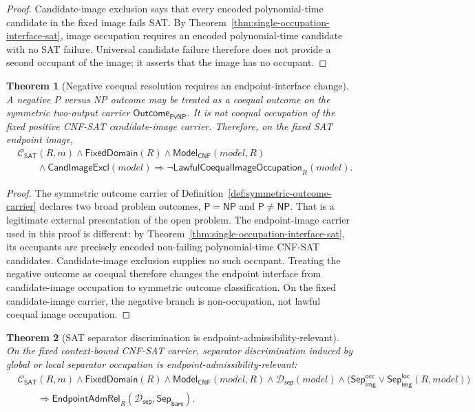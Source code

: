\documentclass[11pt]{article}
\newtheorem{theorem}{Theorem}[section]
\theoremstyle{definition}
\theoremstyle{remark}
\newcommand{\SepBare}{\mathsf{Sep}_{\mathsf{bare}}}
\newcommand{\SepImgOcc}{\mathsf{Sep}_{\mathsf{img}}^{\mathsf{occ}}}
\newcommand{\LocalSepImgOcc}{\mathsf{Sep}_{\mathsf{img}}^{\mathsf{loc}}}
\newcommand{\Pclass}{\mathsf{P}}
\newcommand{\NPclass}{\mathsf{NP}}
\newcommand{\ClayCtx}{\mathcal{C}_{\mathsf{SAT}}(R,m)}
\newcommand{\FixedDom}{\mathsf{FixedDomain}}
\newcommand{\SepDisc}{\mathcal{D}_{\mathsf{sep}}}
\newcommand{\ModelOfCnf}{\mathsf{Model}_{\mathsf{CNF}}}
\newcommand{\CandImageExcl}{\mathsf{CandImageExcl}}
\newcommand{\OutcomePvNP}{\mathsf{Outcome}_{\mathsf{PvNP}}}
\newcommand{\LawfulCoequalImageOcc}{\mathsf{LawfulCoequalImageOccupation}}
\newcommand{\EndpointAdmRel}{\mathsf{EndpointAdmRel}}
\begin{document}
\begin{proof}
Candidate-image exclusion says that every encoded polynomial-time candidate in the fixed image fails SAT. By Theorem~\ref{thm:single-occupation-interface-sat}, image occupation requires an encoded polynomial-time candidate with no SAT failure. Universal candidate failure therefore does not provide a second occupant of the image; it asserts that the image has no occupant.
\end{proof}

\begin{theorem}[Negative coequal resolution requires an endpoint-interface change]\label{thm:negative-coequal-requires-interface-change}
A negative P versus NP outcome may be treated as a coequal outcome on the symmetric two-output carrier \(\OutcomePvNP\). It is not coequal occupation of the fixed positive CNF-SAT candidate-image carrier. Therefore, on the fixed SAT endpoint image,
\[
\begin{aligned}
  &\ClayCtx\wedge\FixedDom(R)\wedge\ModelOfCnf(model,R)\\
  &\qquad\wedge\CandImageExcl(model)
  \Rightarrow \neg\LawfulCoequalImageOcc_R(model).
\end{aligned}
\]
\end{theorem}

\begin{proof}
The symmetric outcome carrier of Definition~\ref{def:symmetric-outcome-carrier} declares two broad problem outcomes, \(\Pclass=\NPclass\) and \(\Pclass\neq\NPclass\). That is a legitimate external presentation of the open problem. The endpoint-image carrier used in this proof is different: by Theorem~\ref{thm:single-occupation-interface-sat}, its occupants are precisely encoded non-failing polynomial-time CNF-SAT candidates. Candidate-image exclusion supplies no such occupant. Treating the negative outcome as coequal therefore changes the endpoint interface from candidate-image occupation to symmetric outcome classification. On the fixed candidate-image carrier, the negative branch is non-occupation, not lawful coequal image occupation.
\end{proof}


\begin{theorem}[SAT separator discrimination is endpoint-admissibility-relevant]\label{thm:sat-sepdisc-endpoint-adm-relevant}
On the fixed context-bound CNF-SAT carrier, separator discrimination induced by global or local separator occupation is endpoint-admissibility-relevant:
\[
\begin{aligned}
  &\ClayCtx\wedge\FixedDom(R)\wedge\ModelOfCnf(model,R)\wedge\SepDisc(model)\wedge
  \bigl(\SepImgOcc\vee\LocalSepImgOcc(R,model)\bigr)\\
  &\qquad\Rightarrow \EndpointAdmRel_R(\SepDisc,\SepBare).
\end{aligned}
\]
\end{theorem}
\end{document}
